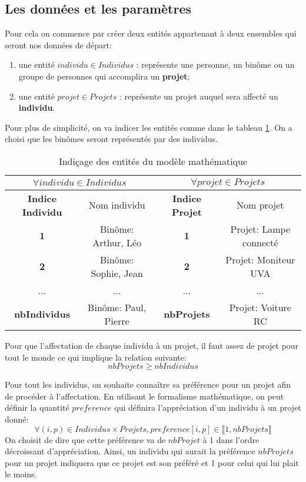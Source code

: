 \documentclass{polytech/polytech}
\begin{document}
\subsection{Les données et les paramètres}
\label{sec:donnees_params}
Pour cela on commence par créer deux entités appartenant à deux ensembles qui seront nos données de départ:
\begin{enumerate}
\item une entité $individu \in Individus$ : représente une personne, un binôme ou un groupe de personnes qui accomplira un \textbf{projet};
\item une entité  $projet \in Projets$ : représente un projet auquel sera affecté un \textbf{individu}.
\end{enumerate}

Pour plus de simplicité, on va indicer les entités comme dans le tableau \ref{tab:indice_entite_mod_math}. On a choisi que les binômes seront représentés par des individus.
\begin{table}
\caption{Indiçage des entités du modèle mathématique}
\label{tab:indice_entite_mod_math}
\begin{tabular}{|c|c|c|c|}
\hline 
\multicolumn{2}{|c|}{$\forall individu \in Individus$} & \multicolumn{2}{|c|}{$\forall projet \in Projets$} \\ 
\hline 
\textbf{Indice Individu} & Nom individu &\textbf{ Indice Projet} & Nom projet \\ 
\hline 
\textbf{1} & Binôme: Arthur, Léo & \textbf{1} & Projet: Lampe connecté \\ 
\hline 
\textbf{2} & Binôme: Sophie, Jean & \textbf{2} & Projet: Moniteur UVA \\ 
\hline 
... & ... & ... & ... \\ 
\hline 
\textbf{nbIndividus} & Binôme: Paul, Pierre &\textbf{ nbProjets} & Projet: Voiture RC \\ 
\hline 
\end{tabular} 
\end{table}

Pour que l'affectation de chaque individu à un projet, il faut assez de projet pour tout le monde ce qui implique la relation suivante:
$$ nbProjets \geqslant nbIndividus$$

Pour tout les individus, on souhaite connaître sa préférence pour un projet afin de procéder à l'affectation. En utilisant le formalisme mathématique, on peut définir la quantité $preference$ qui définira l'appréciation d'un individu à un projet donné:
$$
\forall (i,p) \in Individus \times Projets, 
preference[i,p] \in \llbracket 1, nbProjets \rrbracket
$$
On choisit de dire que cette préférence va de $nbProjet$ à 1 dans l'ordre décroissant d'appréciation. Ainsi, un individu qui aurait la préférence $nbProjets$ pour un projet indiquera que ce projet est son préféré et 1 pour celui qui lui plait le moins.
\end{document}
